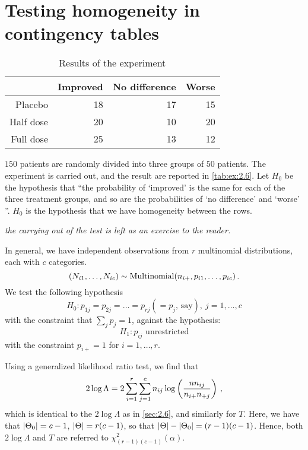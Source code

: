 \section{Testing homogeneity in contingency tables}
\label{sec:2.7}

\begin{example}
\begin{table}[h]
  \centering
  \begin{tabular}{rrrr}
    \toprule
    & Improved & No difference & Worse \\
    \midrule
    Placebo & 18 & 17 & 15 \\
    Half dose & 20 & 10 & 20 \\
    Full dose & 25 & 13 & 12 \\
    \bottomrule
  \end{tabular}
  \caption{Results of the experiment}
  \label{tab:ex:2.6}
\end{table}

$150$ patients are randomly divided into three groups of $50$ patients. The experiment is carried out, and the result are reported in \vref{tab:ex:2.6}.
Let $H_0$ be the hypothesis that ``the probability of `improved' is the same for each of the three treatment groups, and so are the probabilities of `no difference' and `worse' ''.
$H_0$ is the hypothesis that we have homogeneity between the rows.

\emph{the carrying out of the test is left as an exercise to the reader.}
\end{example}

In general, we have independent observations from $r$ multinomial distributions, each with $c$ categories.
\[
(N_{i1}, \dotsc, N_{ic}) \sim \operatorname{Multinomial}(n_{i+}, p_{i1}, \dotsc, p_{ic}) \, {.}
\]
We test the following hypothesis
\[
H_0 : p_{1j} = p_{2j} = \dotsc = p_{rj} ( = p_j \text{, say}), \ j = 1, \dotsc, c
\]
with the constraint that $\sum_j p_j = 1$, against the hypothesis:
\[
H_1 : p_{ij} \text{ unrestricted}
\]
with the constraint $p_{i+} = 1$ for $i = 1, \dotsc, r$.

Using a generalized likelihood ratio test, we find that
\[
2 \log \Lambda = 2 \sum_{i = 1}^r \sum_{j = 1}^c n_{ij} \log \left( \frac{n n_{ij}}{n_{i+}n_{+j}} \right) \, {,}
\]
which is identical to the $2 \log \Lambda$ as in \cref{sec:2.6}, and similarly for $T$.
Here, we have that $\lvert\Theta_0\rvert = c-1$, $\lvert\Theta\rvert = r(c-1)$, so that $\lvert\Theta\rvert - \lvert\Theta_0\rvert = (r-1)(c-1)$.
Hence, both $2 \log \Lambda$ and $T$ are referred to $\chi^2_{(r-1)(c-1)} (\alpha)$.

